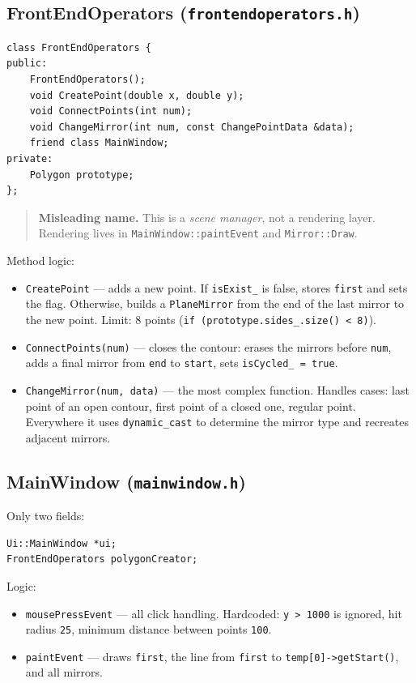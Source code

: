 \documentclass[a4paper,11pt]{article}
\newcommand{\file}[1]{\texttt{#1}}
\newcommand{\code}[1]{\texttt{#1}}
\begin{document}
\subsection{FrontEndOperators (\file{frontendoperators.h})}

\begin{lstlisting}[caption={FrontEndOperators}]
class FrontEndOperators {
public:
    FrontEndOperators();
    void CreatePoint(double x, double y);
    void ConnectPoints(int num);
    void ChangeMirror(int num, const ChangePointData &data);
    friend class MainWindow;
private:
    Polygon prototype;
};
\end{lstlisting}

\begin{quote}
\textbf{Misleading name.} This is a \emph{scene manager}, not a
rendering layer. Rendering lives in \code{MainWindow::paintEvent} and
\code{Mirror::Draw}.
\end{quote}

Method logic:
\begin{itemize}[leftmargin=*]
    \item \code{CreatePoint} — adds a new point. If \code{isExist\_} is
          false, stores \code{first} and sets the flag. Otherwise,
          builds a \code{PlaneMirror} from the end of the last mirror
          to the new point. Limit: 8 points
          (\code{if (prototype.sides\_.size() < 8)}).
    \item \code{ConnectPoints(num)} — closes the contour: erases the
          mirrors before \code{num}, adds a final mirror from
          \code{end} to \code{start}, sets \code{isCycled\_ = true}.
    \item \code{ChangeMirror(num, data)} — the most complex function.
          Handles cases: last point of an open contour, first point of
          a closed one, regular point. Everywhere it uses
          \code{dynamic\_cast} to determine the mirror type and
          recreates adjacent mirrors.
\end{itemize}

\subsection{MainWindow (\file{mainwindow.h})}

Only two fields:
\begin{lstlisting}
Ui::MainWindow *ui;
FrontEndOperators polygonCreator;
\end{lstlisting}

Logic:
\begin{itemize}[leftmargin=*]
    \item \code{mousePressEvent} — all click handling. Hardcoded:
          \code{y > 1000} is ignored, hit radius \code{25}, minimum
          distance between points \code{100}.
    \item \code{paintEvent} — draws \code{first}, the line from
          \code{first} to \code{temp[0]->getStart()}, and all mirrors.
\end{itemize}
\end{document}
